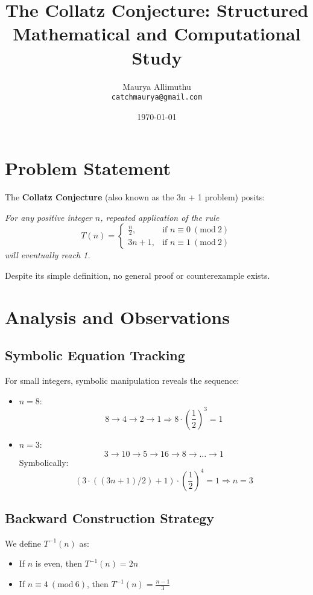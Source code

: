 \documentclass{article}
\title{The Collatz Conjecture: Structured Mathematical and Computational Study}
\author{Maurya Allimuthu\\ \texttt{catchmaurya@gmail.com} }
\date{\today}
\begin{document}
\maketitle

\section{Problem Statement}

The \textbf{Collatz Conjecture} (also known as the 3n + 1 problem) posits:

\textit{For any positive integer \( n \), repeated application of the rule}
\[
T(n) = \begin{cases}
\frac{n}{2}, & \text{if } n \equiv 0 \ (\mathrm{mod}\ 2) \\
3n + 1, & \text{if } n \equiv 1 \ (\mathrm{mod}\ 2)
\end{cases}
\]
\textit{will eventually reach 1.}

Despite its simple definition, no general proof or counterexample exists.

\section{Analysis and Observations}

\subsection{Symbolic Equation Tracking}

For small integers, symbolic manipulation reveals the sequence:

\begin{itemize}
    \item \( n = 8 \):
    \[
    8 \rightarrow 4 \rightarrow 2 \rightarrow 1 \Rightarrow 8 \cdot \left(\frac{1}{2}\right)^3 = 1
    \]
    \item \( n = 3 \):
    \[
    3 \rightarrow 10 \rightarrow 5 \rightarrow 16 \rightarrow 8 \rightarrow \dots \rightarrow 1
    \]
    Symbolically:
    \[
    (3 \cdot ((3n + 1)/2) + 1) \cdot \left(\frac{1}{2}\right)^4 = 1 \Rightarrow n = 3
    \]
\end{itemize}

\subsection{Backward Construction Strategy}

We define \( T^{-1}(n) \) as:
\begin{itemize}
    \item If \( n \) is even, then \( T^{-1}(n) = 2n \)
    \item If \( n \equiv 4 \ (\mathrm{mod}\ 6) \), then \( T^{-1}(n) = \frac{n - 1}{3} \)
\end{itemize}
\end{document}

